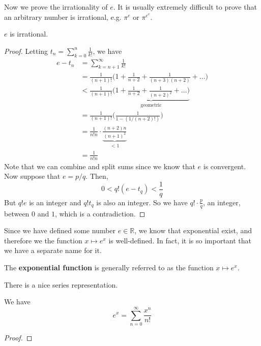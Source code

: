   Now we prove the irrationality of $e$. It is usually extremely difficult to prove that an arbitrary number is irrational, e.g. $\pi^e$ or $\pi^{e^e}$. 

  \begin{theorem}[$e$ is Irrational]
    \label{thm:e-is-irrational}
    $e$ is irrational. 
  \end{theorem}
  \begin{proof} 
    Letting $t_n = \sum_{k=0}^n \frac{1}{k!}$, we have 
    \begin{align}
      e - t_n & = \sum_{k=n+1}^\infty \frac{1}{k!} \\
              & = \frac{1}{(n+1)!} \bigg( 1 + \frac{1}{n+2} + \frac{1}{(n+3)(n+2)} + \ldots \bigg) \\
              & < \frac{1}{(n+1)!} \underbrace{\bigg( 1 + \frac{1}{n+2} + \frac{1}{(n+2)^2} + \ldots \bigg)}_{\text{geometric}} \\
              & = \frac{1}{(n+1)!} \bigg( \frac{1}{1 - (1/(n+2)!)}\bigg) \\
              & = \frac{1}{n! n} \cdot \underbrace{\frac{(n+2) n}{(n+1)^2}}_{< 1} \\
              & = \frac{1}{n! n}
    \end{align}
    Note that we can combine and split sums since we know that $e$ is convergent. Now suppose that $e = p/q$. Then, 
    \begin{equation}
      0 < q! (e - t_q) < \frac{1}{q}
    \end{equation}
    But $q! e$ is an integer and $q! t_q$ is also an integer. So we have $q! \cdot \frac{p}{q}$, an integer, between $0$ and $1$, which is a contradiction. 
  \end{proof}

  Since we have defined some number $e \in \mathbb{R}$, we know that exponential exist, and therefore we the function $x \mapsto e^x$ is well-defined. In fact, it is so important that we have a separate name for it. 

  \begin{definition}
    \label{def:exponential-function}
    The \textbf{exponential function} is generally referred to as the function $x \mapsto e^x$. 
  \end{definition}

  There is a nice series representation. 

  \begin{theorem}
    \label{thm:exponential-function-as-a-series}
    We have 
    \begin{equation}
      e^x = \sum_{n=0}^\infty \frac{x^n}{n!}
    \end{equation}
  \end{theorem}
  \begin{proof}
    
  \end{proof}

